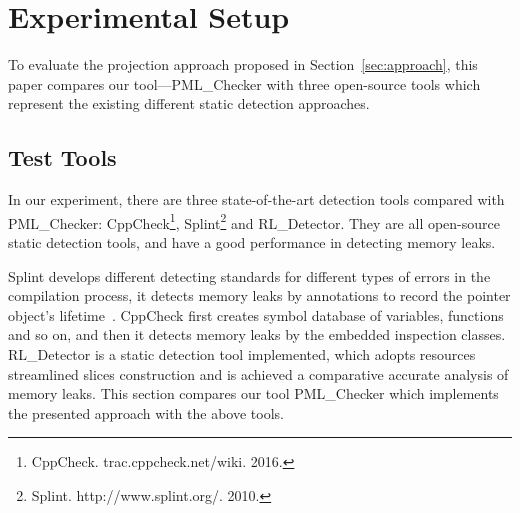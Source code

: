 \section{Experimental Setup}\label{sec:setup}
To evaluate the projection approach proposed in Section~\ref{sec:approach}, 
this paper compares our tool---PML\_Checker with three open-source tools which represent the existing different static detection approaches. 
\subsection{Test Tools}\label{ssec:tool}
In our experiment, there are three state-of-the-art detection tools compared with PML\_Checker: CppCheck\footnote{CppCheck. trac.cppcheck.net/wiki. 2016.}, Splint\footnote{Splint. http://www.splint.org/. 2010.} and RL\_Detector. They are all open-source static detection tools, and have a good performance in detecting memory leaks.

Splint develops different detecting standards for different types of errors in the compilation process, it detects memory leaks by annotations to record the pointer object’s lifetime~\cite{EL02}. CppCheck first creates symbol database of variables, functions and so on, and then it detects memory leaks by the embedded inspection classes. RL\_Detector is a static detection tool implemented, which adopts resources streamlined slices construction and is achieved a comparative accurate analysis of memory leaks. This section compares our tool PML\_Checker which implements the presented approach with the above tools.
